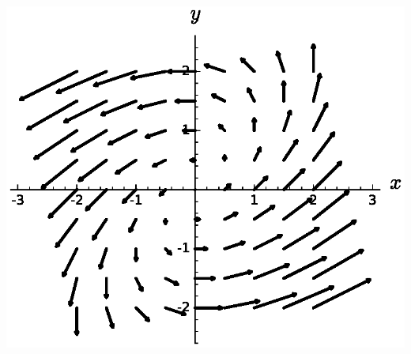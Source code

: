 \begin{ex}
\begin{minipage}{.4\textwidth}
        \includegraphics[width=\textwidth]{images/mult2}
    \end{minipage}
    

\end{ex}
